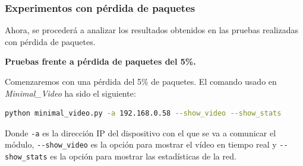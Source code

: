 \subsubsection{Experimentos con pérdida de paquetes}

Ahora, se procederá a analizar los resultados obtenidos en las pruebas realizadas con pérdida de paquetes. 
\vspace{\baselineskip}

\textbf{Pruebas frente a pérdida de paquetes del 5\%.}
\vspace{\baselineskip}

Comenzaremos con una pérdida del 5\% de paquetes. El comando usado en \textit{Minimal\_Video} ha sido el siguiente:

\begin{lstlisting}[language=bash]
python minimal_video.py -a 192.168.0.58 --show_video --show_stats
\end{lstlisting}
Donde \verb|-a| es la dirección IP del dispositivo con el que se va a comunicar el módulo, \verb|--show_video| es la opción para mostrar el vídeo en tiempo real y \verb|--show_stats| es la opción para mostrar las estadísticas de la red.
\vspace{\baselineskip}

